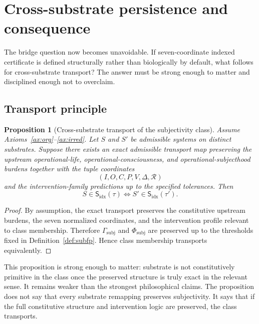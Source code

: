 \documentclass[11pt,a4paper]{article}
\newtheorem{proposition}[theorem]{Proposition}
\theoremstyle{definition}
\newcommand{\Subfp}{\mathsf{S}_{\mathrm{idx}}}
\newcommand{\SelfIndex}{I}
\newcommand{\OwnField}{O}
\newcommand{\ContField}{C}
\newcommand{\Persp}{P}
\newcommand{\ValAsym}{V}
\newcommand{\IntervProf}{\Delta}
\newcommand{\Irred}{\mathcal{R}}
\newcommand{\GateSubj}{\Gamma_{\mathrm{subj}}}
\newcommand{\PhiSubj}{\Phi_{\mathrm{subj}}}
\begin{document}
\section{Cross-substrate persistence and consequence}
The bridge question now becomes unavoidable. If seven-coordinate indexed certificate is defined structurally rather than biologically by default, what follows for cross-substrate transport? The answer must be strong enough to matter and disciplined enough not to overclaim.

\subsection{Transport principle}
\begin{proposition}[Cross-substrate transport of the subjectivity class]
Assume Axioms~\ref{ax:org}--\ref{ax:irred}. Let $S$ and $S'$ be admissible systems on distinct substrates. Suppose there exists an exact admissible transport map preserving the upstream operational-life, operational-consciousness, and operational-subjecthood burdens together with the tuple coordinates
\[
(\SelfIndex,\OwnField,\ContField,\Persp,\ValAsym,\IntervProf,\Irred)
\]
and the intervention-family predictions up to the specified tolerances. Then
\[
S\in\Subfp(\tau)\Longleftrightarrow S'\in\Subfp(\tau').
\]
\end{proposition}

\begin{proof}
By assumption, the exact transport preserves the constitutive upstream burdens, the seven normalized coordinates, and the intervention profile relevant to class membership. Therefore $\GateSubj$ and $\PhiSubj$ are preserved up to the thresholds fixed in Definition~\ref{def:subfp}. Hence class membership transports equivalently.
\end{proof}

This proposition is strong enough to matter: substrate is not constitutively primitive in the class once the preserved structure is truly exact in the relevant sense. It remains weaker than the strongest philosophical claims. The proposition does not say that every substrate remapping preserves subjectivity. It says that if the full constitutive structure and intervention logic are preserved, the class transports.
\end{document}
